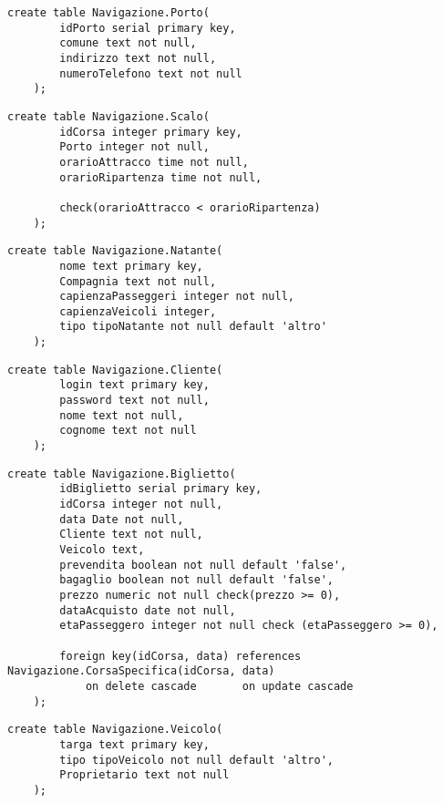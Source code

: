 \begin{lstlisting}[style=sqlstyle, title = {Creazione della tabella Porto}]
    create table Navigazione.Porto(
        idPorto serial primary key,
        comune text not null,
        indirizzo text not null,
        numeroTelefono text not null
    );
\end{lstlisting}

\begin{lstlisting}[style=sqlstyle, title = {Creazione della tabella Scalo}]
    create table Navigazione.Scalo(
        idCorsa integer primary key,
        Porto integer not null,
        orarioAttracco time not null,
        orarioRipartenza time not null,
    
        check(orarioAttracco < orarioRipartenza)
    );
\end{lstlisting}

\begin{lstlisting}[style=sqlstyle, title = {Creazione della tabella Natante}]
    create table Navigazione.Natante(
        nome text primary key,
        Compagnia text not null,
        capienzaPasseggeri integer not null,
        capienzaVeicoli integer,
        tipo tipoNatante not null default 'altro'
    );
\end{lstlisting}

\begin{lstlisting}[style=sqlstyle, title = {Creazione della tabella Cliente}]
    create table Navigazione.Cliente(
        login text primary key,
        password text not null,
        nome text not null,
        cognome text not null
    );
\end{lstlisting}

\begin{lstlisting}[style=sqlstyle, title = {Creazione della tabella Biglietto}]
    create table Navigazione.Biglietto(
        idBiglietto serial primary key,
        idCorsa integer not null,
        data Date not null,
        Cliente text not null,
        Veicolo text,
        prevendita boolean not null default 'false',
        bagaglio boolean not null default 'false',
        prezzo numeric not null check(prezzo >= 0),
        dataAcquisto date not null,
        etaPasseggero integer not null check (etaPasseggero >= 0),
    
        foreign key(idCorsa, data) references Navigazione.CorsaSpecifica(idCorsa, data)
            on delete cascade       on update cascade
    );
\end{lstlisting}

\begin{lstlisting}[style=sqlstyle, title = {Creazione della tabella Veicolo}]
    create table Navigazione.Veicolo(
        targa text primary key,
        tipo tipoVeicolo not null default 'altro',
        Proprietario text not null
    );
\end{lstlisting}

